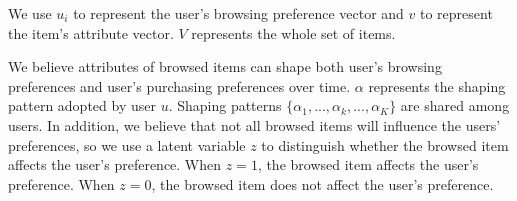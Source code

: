 \documentclass[11pt]{article}
\begin{document}


We use $u_i$ to represent the user's browsing preference vector and $v$ to represent the item's attribute vector. $V$ represents the whole set of items.  

We believe attributes of browsed items can shape both user's browsing preferences and user's purchasing preferences over time. $\alpha$ represents the shaping pattern adopted by user $u$. Shaping patterns $\{\alpha_1, ..., \alpha_k, ..., \alpha_K\}$ are shared among users. In addition, we believe that not all browsed items will influence the users' preferences, so we use a latent variable $z$ to distinguish whether the browsed item affects the user's preference. When $z=1$, the browsed item affects the user's preference. When $z=0$, the browsed item does not affect the user's preference. 
\end{document}
